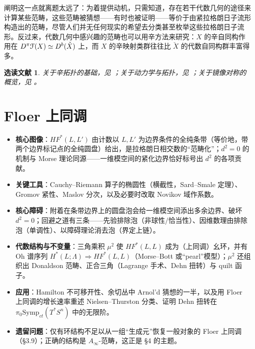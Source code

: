\documentclass[11pt,a4paper]{article}
\numberwithin{equation}{section}
\newtheorem*{Notes}{选读文献}
\newcommand{\scrF}{\EuScript{F}}
\newcommand{\Cech}[1]{\check{#1}}
\newcommand{\Symp}{\mathrm{Symp}}
\begin{document}
阐明这一点就离题太远了：为着提供动机，只需知道，存在若干代数几何的途径来计算某些范畴，这些范畴被猜想——有时也被证明——等价于由紧拉格朗日子流形构造出的范畴，尽管人们并无任何现实的希望去分类甚至枚举这些拉格朗日子流形。反过来，代数几何中感兴趣的范畴也可以用辛方法来研究：$X$ 的辛自同构作用在 $D^{\pi}\scrF(X)\simeq D^b(\Cech{X})$ 上，而 $X$ 的辛映射类群往往比 $\Cech{X}$ 的代数自同构群丰富得多。

\begin{Notes} 关于辛拓扑的基础，见 \cite{ACdaS, McD-S}；关于动力学与拓扑，见 \cite{HZ, EOSS}；关于镜像对称的概览，见 \cite{AspinwallEtAl, Ballard, Gross:tropical}。\end{Notes}




\section{Floer 上同调}\label{Sec:Floer}

\begin{keypoints}
\begin{itemize}
  \item \textbf{核心图像}：$HF^*(L,L')$ 由计数以 $L,L'$ 为边界条件的全纯条带（等价地，带两个边界标记点的全纯圆盘）给出，是拉格朗日相交数的“范畴化”；$d^2=0$ 的机制与 Morse 理论同源——一维模空间的紧化边界恰好标号出 $d^2$ 的各项贡献。
  \item \textbf{关键工具}：Cauchy–Riemann 算子的椭圆性（横截性，Sard–Smale 定理）、Gromov 紧性、Maslov 分次，以及必要时改取 Novikov 域作系数。
  \item \textbf{核心障碍}：附着在条带边界上的圆盘泡会给一维模空间添出多余边界、破坏 $d^2=0$；回避之道有三条——先验排除泡（非球性/恰当性）、因维数理由排除泡（单调性）、以障碍理论消去泡（界定上链）。
  \item \textbf{代数结构与不变量}：三角乘积 $\mu^2$ 使 $HF^*(L,L)$ 成为（上同调）幺环，并有 Oh 谱序列 $H^*(L;\Lambda)\Rightarrow HF^*(L,L)$（Morse–Bott 或“pearl”模型）；$\mu^2$ 还组织出 Donaldson 范畴、正合三角（Lagrange 手术、Dehn 扭转）与 quilt 函子。
  \item \textbf{应用}：Hamilton 不可移开性、余切丛中 Arnol'd 猜想的一半，以及用 Floer 上同调的增长速率重述 Nielsen–Thurston 分类、证明 Dehn 扭转在 $\pi_0\Symp_{ct}(T^*S^n)$ 中的无限阶。
  \item \textbf{遗留问题}：仅有环结构不足以从一组“生成元”恢复一般对象的 Floer 上同调（§3.9）；正确的结构是 $A_\infty$-范畴，这正是 §4 的主题。
\end{itemize}
\end{keypoints}
\end{document}
